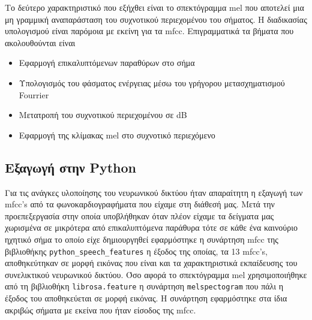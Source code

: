 Το δεύτερο χαρακτηριστικό που εξήχθει είναι το σπεκτόγραμμα mel που αποτελεί
μια μη γραμμική αναπαράσταση του συχνοτικού περιεχομένου του σήματος. Η
διαδικασίας υπολογισμού είναι παρόμοια με εκείνη για τα mfcc. Επιγραμματικά τα
βήματα που ακολουθούνται είναι \cite{melspectogram}

\begin{itemize}
	\item Εφαρμογή επικαλυπτόμενων παραθύρων στο σήμα
  \item Υπολογισμός του φάσματος ενέργειας μέσω του γρήγορου μετασχηματισμού
    Fourrier
	\item Μετατροπή του συχνοτικού περιεχομένου σε dB
	\item Εφαρμογή της κλίμακας mel στο συχνοτικό περιεχόμενο
\end{itemize}
 
\subsection{Eξαγωγή στην Python}
Για τις ανάγκες υλοποίησης του νευρωνικού δικτύου ήταν απαραίτητη η εξαγωγή των
mfcc's από τα φωνοκαρδιογραφήματα  που είχαμε στη διάθεσή μας. Μετά την
προεπεξεργασία στην οποία υποβλήθηκαν όταν πλέον είχαμε τα δείγματα μας
χωρισμένα σε μικρότερα από επικαλυπτόμενα παράθυρα τότε σε κάθε ένα καινούριο
ηχητικό σήμα το οποίο είχε δημιουργηθεί εφαρμόστηκε η συνάρτηση mfcc της
βιβλιοθήκης \verb|python_speech_features| η έξοδος της οποίας, τα 13 mfcc's,
αποθηκεύτηκαν σε μορφή εικόνας που είναι και τα χαρακτηριστικά εκπαίδευσης  του
συνελικτικού νευρωνικού δικτύου. Όσο αφορά το σπεκτόγραμμα mel χρησιμοποιήθηκε
από τη βιβλιοθήκη \verb|librosa.feature| η συνάρτηση \verb|melspectogram| που
πάλι η έξοδος του αποθηκεύεται σε μορφή εικόνας. Η συνάρτηση εφαρμόστηκε στα
ίδια ακριβώς σήματα με εκείνα που ήταν είσοδος της mfcc.
